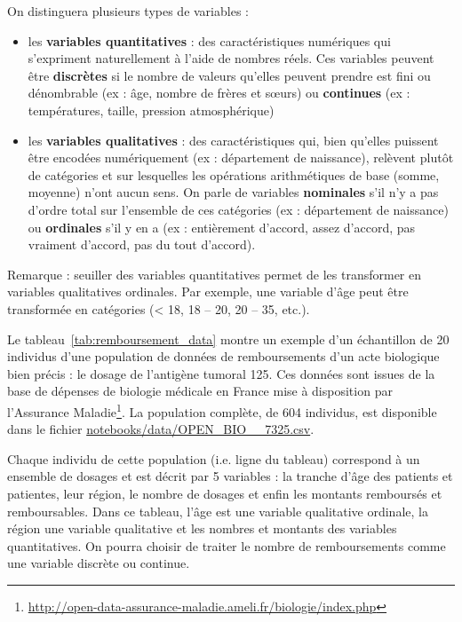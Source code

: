 On distinguera plusieurs types de variables :
\begin{itemize}
\item les \textbf{variables quantitatives} : des caractéristiques numériques
  qui s'expriment naturellement à l'aide de nombres réels. Ces variables
  peuvent être \textbf{discrètes} si le nombre de valeurs qu'elles peuvent
  prendre est fini ou dénombrable (ex : âge, nombre de frères et s\oe{}urs) ou
  \textbf{continues} (ex : températures, taille, pression atmosphérique)
\item les \textbf{variables qualitatives} : des caractéristiques qui, bien
  qu'elles puissent être encodées numériquement (ex : département de
  naissance), relèvent plutôt de catégories et sur lesquelles les opérations
  arithmétiques de base (somme, moyenne) n'ont aucun sens. On parle de
  variables \textbf{nominales} s'il n'y a pas d'ordre total sur l'ensemble de
  ces catégories (ex : département de naissance) ou \textbf{ordinales} s'il y
  en a (ex : entièrement d'accord, assez d'accord, pas vraiment d'accord, pas
  du tout d'accord).
\end{itemize}

Remarque : seuiller des variables quantitatives permet de les transformer en
variables qualitatives ordinales. Par exemple, une variable d'âge peut être
transformée en catégories (< 18, 18 -- 20, 20 -- 35, etc.).

Le tableau~\ref{tab:remboursement_data} montre un exemple d'un échantillon de
20 individus d'une population de données de remboursements d'un acte biologique
bien précis : le dosage de l'antigène tumoral 125. Ces données sont issues de
la base de dépenses de biologie médicale en France mise à disposition par
l'Assurance
Maladie\footnote{\url{http://open-data-assurance-maladie.ameli.fr/biologie/index.php}}. La
population complète, de 604 individus, est disponible dans le fichier \href{https://github.com/chagaz/sdd_2025/blob/main/poly/notebooks/data/OPEN_BIO_2018_7325.csv}{\ttfamily notebooks/\allowbreak data/\allowbreak OPEN\_\allowbreak BIO\_\_\allowbreak 7325.csv}.

Chaque individu de cette population (i.e. ligne du tableau) correspond à un
ensemble de dosages et est décrit par 5 variables : la tranche d'âge des
patients et patientes, leur région, le nombre de dosages et enfin les
montants remboursés et remboursables. Dans ce tableau, l'âge est une variable
qualitative ordinale, la région une variable qualitative et les nombres et
montants des variables quantitatives. On pourra choisir de traiter le nombre de
remboursements comme une variable discrète ou continue.


